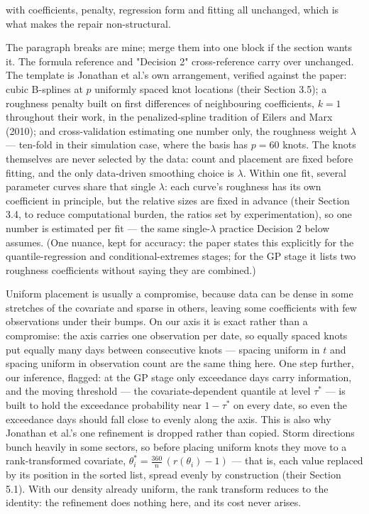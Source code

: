 \documentclass[11pt]{article}
\begin{document}
with coefficients, penalty, regression form and fitting all unchanged, which is what makes the repair non-structural.

{\color{blue}
The paragraph breaks are mine; merge them into one block if the section wants it. The formula reference and "Decision 2" cross-reference carry over unchanged.
The template is Jonathan et al.'s own arrangement, verified against the paper: cubic B-splines at $p$ uniformly spaced knot locations (their Section 3.5); a roughness penalty built on first differences of neighbouring coefficients, $k=1$ throughout their work, in the penalized-spline tradition of Eilers and Marx (2010); and cross-validation estimating one number only, the roughness weight $\lambda$ — ten-fold in their simulation case, where the basis has $p = 60$ knots. The knots themselves are never selected by the data: count and placement are fixed before fitting, and the only data-driven smoothing choice is $\lambda$. Within one fit, several parameter curves share that single $\lambda$: each curve's roughness has its own coefficient in principle, but the relative sizes are fixed in advance (their Section 3.4, to reduce computational burden, the ratios set by experimentation), so one number is estimated per fit — the same single-$\lambda$ practice Decision 2 below assumes. (One nuance, kept for accuracy: the paper states this explicitly for the quantile-regression and conditional-extremes stages; for the GP stage it lists two roughness coefficients without saying they are combined.)

Uniform placement is usually a compromise, because data can be dense in some stretches of the covariate and sparse in others, leaving some coefficients with few observations under their bumps. On our axis it is exact rather than a compromise: the axis carries one observation per date, so equally spaced knots put equally many days between consecutive knots — spacing uniform in $t$ and spacing uniform in observation count are the same thing here. One step further, our inference, flagged: at the GP stage only exceedance days carry information, and the moving threshold — the covariate-dependent quantile at level $\tau^{*}$ — is built to hold the exceedance probability near $1-\tau^{*}$ on every date, so even the exceedance days should fall close to evenly along the axis. This is also why Jonathan et al.'s one refinement is dropped rather than copied. Storm directions bunch heavily in some sectors, so before placing uniform knots they move to a rank-transformed covariate, $\theta_i^{*} = \tfrac{360}{n}\,(r(\theta_i)-1)$ — that is, each value replaced by its position in the sorted list, spread evenly by construction (their Section 5.1). With our density already uniform, the rank transform reduces to the identity: the refinement does nothing here, and its cost never arises.

}
\end{document}
